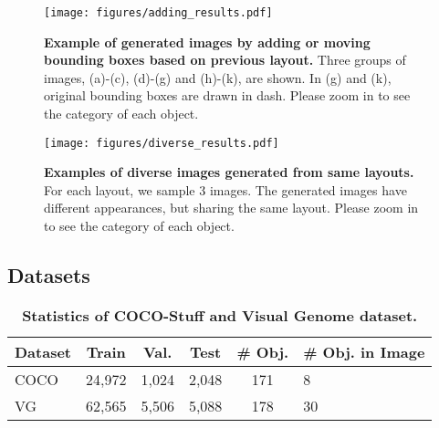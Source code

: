 \documentclass[10pt,twocolumn,letterpaper]{article}
\begin{document}
\begin{figure*}[!t]
    \begin{center}
\texttt{[image: figures/adding\_results.pdf]}
    \end{center}
    \vspace{-0.1in}
    \caption{\textbf{Example of generated images by adding or moving bounding boxes based on previous layout.} Three groups of images, (a)-(c), (d)-(g) and (h)-(k), are shown. In (g) and (k), original bounding boxes are drawn in dash. Please zoom in to see the category of each object.}
    \vspace{-0.2in}
    \label{fig:adding_results}
\end{figure*}

\begin{figure*}[!t]
    \begin{center}
\texttt{[image: figures/diverse\_results.pdf]}
    \end{center}
    \caption{\textbf{Examples of diverse images generated from same layouts.} For each layout, we sample 3 images. The generated images have different appearances, but sharing the same layout. Please zoom in to see the category of each object.}
    \vspace{-0.2in}
    \label{fig:diverse_results}
\end{figure*}

\subsection{Datasets}

\begin{table}[!t]
\footnotesize
\centering
\begin{tabular}{l|c|c|c|c|l}

\textbf{Dataset}       & \textbf{Train}  & \textbf{Val.}   & \textbf{Test}  & \textbf{\# Obj.} & \textbf{\# Obj. in Image}\\ \hline
COCO~\cite{caesar2016coco}          & 24,972 & 1,024 & 2,048 & 171      & \quad 3  8               \\ \hline
VG~\cite{krishna2017visual} & 62,565 & 5,506 & 5,088 & 178      & \quad 3  30             \\ 
\end{tabular}
\vspace{0.05in}
\caption{\textbf{Statistics of COCO-Stuff and Visual Genome dataset.}}
\vspace{-0.2in}
\label{tb:datasets}
\end{table}
\end{document}
